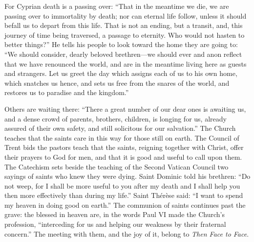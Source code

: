 For Cyprian death is a passing over: ``That in the meantime we die, we are passing over to immortality by death; nor can eternal life follow, unless it should befall us to depart from this life. That is not an ending, but a transit, and, this journey of time being traversed, a passage to eternity. Who would not hasten to better things?'' He tells his people to look toward the home they are going to: ``We should consider, dearly beloved brethren---we should ever and anon reflect that we have renounced the world, and are in the meantime living here as guests and strangers. Let us greet the day which assigns each of us to his own home, which snatches us hence, and sets us free from the snares of the world, and restores us to paradise and the kingdom.''

Others are waiting there: ``There a great number of our dear ones is awaiting us, and a dense crowd of parents, brothers, children, is longing for us, already assured of their own safety, and still solicitous for our salvation.'' The Church teaches that the saints care in this way for those still on earth. The Council of Trent bids the pastors teach that the saints, reigning together with Christ, offer their prayers to God for men, and that it is good and useful to call upon them. The Catechism sets beside the teaching of the Second Vatican Council two sayings of saints who knew they were dying. Saint Dominic told his brethren: ``Do not weep, for I shall be more useful to you after my death and I shall help you then more effectively than during my life.'' Saint Th\'er\`ese said: ``I want to spend my heaven in doing good on earth.'' The communion of saints continues past the grave: the blessed in heaven are, in the words Paul VI made the Church's profession, ``interceding for us and helping our weakness by their fraternal concern.'' The meeting with them, and the joy of it, belong to \emph{Then Face to Face}.
